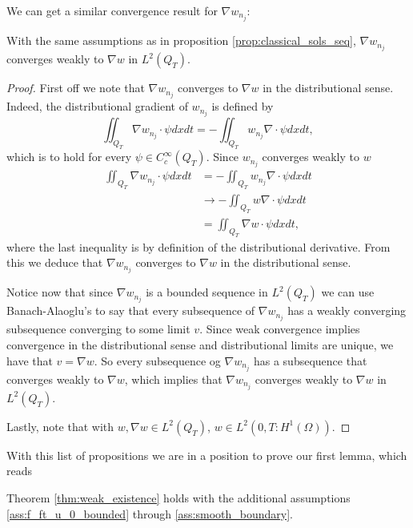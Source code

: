 \documentclass[11pt, a4paper]{article}
\begin{document}
We can get a similar convergence result for $\nabla w_{n_j}$:
\begin{lemma}
\label{prop:gradw_weak_convergence}
With the same assumptions as in proposition \ref{prop:classical_sols_seq},
$\nabla w_{n_j}$ converges weakly to $\nabla w$ in $L^2(Q_T)$.
\end{lemma}
\begin{proof}
First off we note that $\nabla w_{n_j}$ converges to $\nabla w$ in the distributional sense. Indeed, the distributional gradient of $w_{n_j}$ is defined by
	\begin{equation}
	\iint_{Q_T}\nabla w_{n_j}\cdot \psi dxdt = -\iint_{Q_T} w_{n_j} \nabla \cdot \psi dxdt ,
	\end{equation}
	which is to hold for every $\psi \in C^\infty_c(Q_T)$. Since $w_{n_j}$ converges weakly to $w$
	\begin{align*}
	\iint_{Q_T}\nabla w_{n_j} \cdot \psi dxdt &= -\iint_{Q_T} w_{n_j} \nabla \cdot \psi dxdt \\
	&\to -\iint_{Q_T} w \nabla \cdot \psi dxdt \\
	&= \iint_{Q_T} \nabla w \cdot \psi dxdt,
	\end{align*}
	where the last inequality is by definition of the distributional derivative. From this we deduce that $\nabla w_{n_j}$ converges to $\nabla w$ in the distributional sense.
	
	Notice now that since $\nabla w_{n_j}$ is a bounded sequence in $L^2(Q_T)$ we can use Banach-Alaoglu's to say that every subsequence of $\nabla w_{n_j}$ has a weakly converging subsequence converging to some limit $v$. Since weak convergence implies convergence in the distributional sense and distributional limits are unique, we have that $v=\nabla w$. So every subsequence og $\nabla w_{n_j}$ has a subsequence that converges weakly to $\nabla w$, which implies that $\nabla w_{n_j}$ converges weakly to $\nabla w$ in $L^2(Q_T)$.
	
		
	 Lastly, note that with $w, \nabla w \in L^2(Q_T)$, $w \in L^2(0,T: H^1(\Omega))$.
\end{proof}

With this list of propositions we are in a position to prove our first lemma, which reads
\begin{lemma}
\label{lem:existence_part1}
Theorem \ref{thm:weak_existence} holds with the additional assumptions \ref{ass:f_ft_u_0_bounded} through \ref{ass:smooth_boundary}.
\end{lemma}
\end{document}
